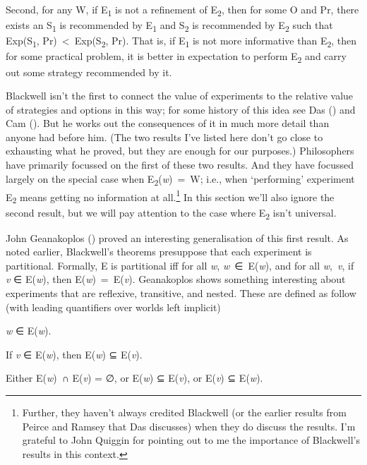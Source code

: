 \documentclass[
  11pt,
  letterpaper,
  DIV=11,
  numbers=noendperiod,
  twoside]{scrartcl}
\providecommand{\tightlist}{%
  \setlength{\itemsep}{0pt}\setlength{\parskip}{0pt}}
\begin{document}
Second, for any W, if E\textsubscript{1} is not a refinement of
E\textsubscript{2}, then for some O and Pr, there exists an
S\textsubscript{1} is recommended by E\textsubscript{1} and
S\textsubscript{2} is recommended by E\textsubscript{2} such that
Exp(S\textsubscript{1}, Pr)~\textless~Exp(S\textsubscript{2}, Pr). That
is, if E\textsubscript{1} is not more informative than
E\textsubscript{2}, then for some practical problem, it is better in
expectation to perform E\textsubscript{2} and carry out some strategy
recommended by it.

Blackwell isn't the first to connect the value of experiments to the
relative value of strategies and options in this way; for some history
of this idea see Das () and Cam
(). But he works out the consequences of
it in much more detail than anyone had before him. (The two results I've
listed here don't go close to exhausting what he proved, but they are
enough for our purposes.) Philosophers have primarily focussed on the
first of these two results. And they have focussed largely on the
special case when E\textsubscript{2}(\emph{w})~=~W; i.e., when
`performing' experiment E\textsubscript{2} means getting no information
at all.\footnote{Further, they haven't always credited Blackwell (or the
  earlier results from Peirce and Ramsey that Das discusses) when they
  do discuss the results. I'm grateful to John Quiggin for pointing out
  to me the importance of Blackwell's results in this context.} In this
section we'll also ignore the second result, but we will pay attention
to the case where E\textsubscript{2} isn't universal.

John Geanakoplos ()
proved an interesting generalisation of this first result. As noted
earlier, Blackwell's theorems presuppose that each experiment is
partitional. Formally, E is partitional iff for all \emph{w},
\emph{w}~∈~E(\emph{w}), and for all \emph{w},~\emph{v}, if \emph{v} ∈
E(\emph{w}), then E(\emph{w})~=~E(\emph{v}). Geanakoplos shows something
interesting about experiments that are reflexive, transitive, and
nested. These are defined as follow (with leading quantifiers over
worlds left implicit)

\begin{description}
\tightlist
\item[Reflexive]
\emph{w} ∈ E(\emph{w}).
\item[Transitive]
If \emph{v} ∈ E(\emph{w}), then E(\emph{w}) ⊆ E(\emph{v}).
\item[Nested]
Either E(\emph{w})~∩ E(\emph{v}) = ∅, or E(\emph{w}) ⊆ E(\emph{v}), or
E(\emph{v}) ⊆ E(\emph{w}).
\end{description}
\end{document}
